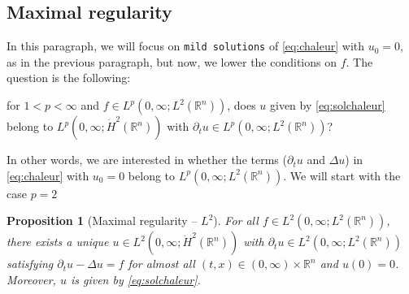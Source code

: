 \documentclass[a4paper, 12pt]{article}
\theoremstyle{plain}
\newtheorem{proposition}{Proposition}[section]
\theoremstyle{definition}
\theoremstyle{remark}
\numberwithin{equation}{section}
\begin{document}
\subsection{Maximal regularity}

In this paragraph, we will focus on {\tt mild solutions} of \eqref{eq:chaleur} with $u_0=0$, as in the previous paragraph, but now,
we lower the conditions on $f$. The question is the following:
%
\begin{center}
\begin{minipage}[t]{12cm}
for $1<p<\infty$ and $f\in L^p(0,\infty;L^2({\mathds{R}}^n))$, does $u$ given by \eqref{eq:solchaleur} belong to 
$L^p(0,\infty;\dot H^2({\mathds{R}}^n))$ with $\partial_t u \in L^p(0,\infty; L^2({\mathds{R}}^n))$?
\end{minipage}
\end{center}
%
In other words, we are interested in whether the terms ($\partial_tu$ and $\Delta u$) in \eqref{eq:chaleur} with $u_0=0$ 
belong to $L^p(0,\infty; L^2({\mathds{R}}^n))$. We will start with the case $p=2$

\begin{proposition}[Maximal regularity -- $L^2$]
\label{prop:MRL2}
For all $f\in L^2(0,\infty; L^2({\mathds{R}}^n))$, there exists a unique $u\in L^2(0,\infty; \dot H^2({\mathds{R}}^n))$ with
$\partial_t u\in L^2(0,\infty; L^2({\mathds{R}}^n))$ satisfying $\partial_t u-\Delta u=f$ for almost all $(t,x)\in (0,\infty)\times{\mathds{R}}^n$
and $u(0)=0$. Moreover, $u$ is given by \eqref{eq:solchaleur}.
\end{proposition}
\end{document}
